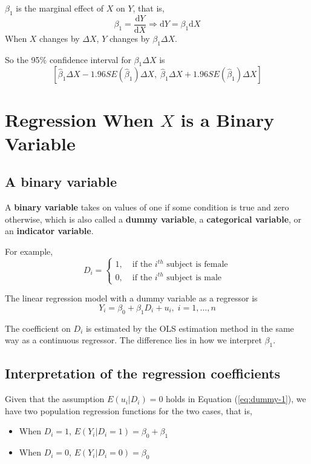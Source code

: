 \documentclass[a4paper,11pt]{article}
\newcommand{\dx}{\mathrm{d}}
\begin{document}
\(\beta_1\) is the marginal effect of \(X\) on \(Y\), that is, 
\[ \beta_1 = \frac{\dx Y}{ \dx X} \Rightarrow \dx Y = \beta_1 \dx X \]
When \(X\) changes by \(\Delta X\), \(Y\) changes by \(\beta_1 \Delta X\). 

So the 95\% confidence interval for \(\beta_1 \Delta X\) is
\[ \left[ \hat{\beta}_1 \Delta X - 1.96 SE(\hat{\beta}_1) \Delta X,\;
\hat{\beta}_1 \Delta X + 1.96SE(\hat{\beta}_1) \Delta X \right] \]


\section{Regression When \(X\) is a Binary Variable}
\label{sec:orgad71cca}

\subsection{A binary variable}
\label{sec:org57c6f1f}

A \textbf{binary variable} takes on values of one if some condition is true
and zero otherwise, which is also called a \textbf{dummy variable}, a
\textbf{categorical variable}, or an \textbf{indicator variable}.

For example, 
\begin{equation*}
D_i = 
\begin{cases}
1,\; &\text{if the } i^{th} \text{ subject is female} \\
0,\; &\text{if the } i^{th} \text{ subject is male} 
\end{cases}
\end{equation*}

The linear regression model with a dummy variable as a regressor is
\begin{equation}
\label{eq:dummy-1}
Y_i = \beta_0 + \beta_1 D_i + u_i,\; i = 1, \ldots, n
\end{equation}

The coefficient on \(D_i\) is estimated by the OLS estimation method
in the same way as a continuous regressor. The difference lies in how
we interpret \(\beta_1\). 


\subsection{Interpretation of the regression coefficients}
\label{sec:orgf04ae68}

Given that the assumption \(E(u_i | D_i) = 0\) holds in Equation
(\ref{eq:dummy-1}), we have two population regression functions for
the two cases, that is,
\begin{itemize}
\item When \(D_i = 1\), \(E(Y_i|D_i = 1) = \beta_0 + \beta_1\)
\item When \(D_i = 0\), \(E(Y_i|D_i = 0) = \beta_0\)
\end{itemize}
\end{document}

